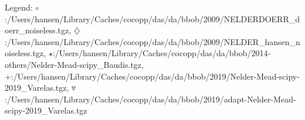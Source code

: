 Legend: {\color{CornflowerBlue}$\circ$}:/Users/hansen/Library/Caches/cocopp/das/da/bbob/2009/NELDERDOERR\_doerr\_noiseless.tgz, {{}$\diamondsuit$}:/Users/hansen/Library/Caches/cocopp/das/da/bbob/2009/NELDER\_hansen\_noiseless.tgz, {\color{Green}$\star$}:/Users/hansen/Library/Caches/cocopp/das/da/bbob/2014-others/Nelder-Mead-scipy\_Baudis.tgz, {\color{red}+}:/Users/hansen/Library/Caches/cocopp/das/da/bbob/2019/Nelder-Mead-scipy-2019\_Varelas.tgz, {\color{brown}$\triangledown$}:/Users/hansen/Library/Caches/cocopp/das/da/bbob/2019/adapt-Nelder-Mead-scipy-2019\_Varelas.tgz